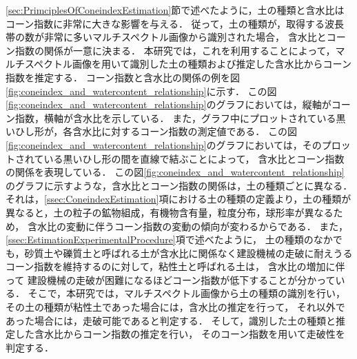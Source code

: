 \ref{sec:PrimciplesOfConeindexEstimation}節で述べたように，土の種類と含水比はコーン指数に非常に大きな影響を与える．
従って，土の種類が，取得する波長帯の数が非常に多いマルチスペクトル画像から識別された場合，
含水比とコーン指数の関係が一意に決まる．
本研究では，これを利用することによって，マルチスペクトル画像を用いて識別した土の種類および推定した含水比からコーン指数を推定する．
コーン指数と含水比の関係の例を図\ref{fig:coneindex_and_watercontent_relationship}に示す．
この図\ref{fig:coneindex_and_watercontent_relationship}のグラフにおいては，縦軸がコーン指数，横軸が含水比を示している．
また，グラフ中にプロットされている黒いひし形が，各含水比に対するコーン指数の測定値である．
この図\ref{fig:coneindex_and_watercontent_relationship}のグラフにおいては，そのプロットされている黒いひし形の間を直線で結ぶことによって，
含水比とコーン指数の関係を表現している．
この図\ref{fig:coneindex_and_watercontent_relationship}のグラフに示すような，含水比とコーン指数の関係は，土の種類ごとに異なる．
それは，\ref{ssec:ConeindexEstimation}項における土の種類の定義より，土の種類が異なると，土の粒子の鉱物組成，有機物含有量，粒度分布，球形率が異なるため，
含水比の変動に伴うコーン指数の変動の傾向が変わるからである．
また，\ref{ssec:EstimationExperimentalProcedure}項で述べたように，
土の種類のなかでも，砂質土や礫質土と呼ばれる土が含水比に関係なく建設機械の走破に耐えうるコーン指数を維持するのに対して，粘性土と呼ばれる土は，
含水比の増加に伴って
建設機械の走破が困難になるほどコーン指数が低下することが分かっている．%
そこで，本研究では，マルチスペクトル画像から土の種類の識別を行い，
その土の種類が粘性土であった場合には，含水比の推定を行って，
それ以外であった場合には，走破可能であると判定する．
そして，識別した土の種類と推定した含水比からコーン指数の推定を行い，
そのコーン指数を用いて走破性を判定する．

